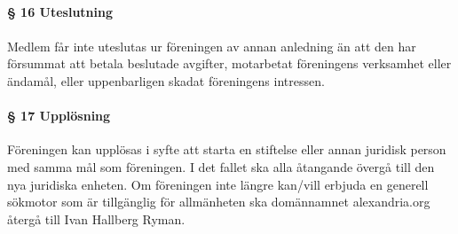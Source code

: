 \documentclass[12pt, a4paper]{article}
\begin{document}
\paragraph{§ 16 Uteslutning}
\paragraph{}
Medlem får inte uteslutas ur föreningen av annan anledning än att den har försummat att betala beslutade avgifter, motarbetat föreningens
verksamhet eller ändamål, eller uppenbarligen skadat föreningens intressen.

\paragraph{§ 17 Upplösning}
Föreningen kan upplösas i syfte att starta en stiftelse eller annan juridisk person med samma mål som föreningen. I det fallet ska alla åtangande övergå till den nya juridiska enheten.
Om föreningen inte längre kan/vill erbjuda en generell sökmotor som är tillgänglig för allmänheten ska domännamnet alexandria.org återgå till Ivan Hallberg Ryman.
\end{document}
